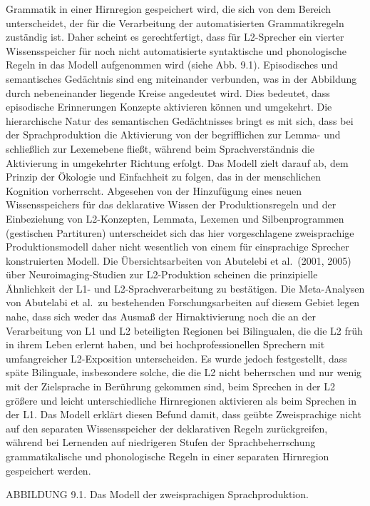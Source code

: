 \documentclass[
  letterpaper,
]{scrbook}
\begin{document}
Grammatik in einer Hirnregion gespeichert wird, die sich von dem Bereich
unterscheidet, der für die Verarbeitung der automatisierten
Grammatikregeln zuständig ist. Daher scheint es gerechtfertigt, dass für
L2-Sprecher ein vierter Wissensspeicher für noch nicht automatisierte
syntaktische und phonologische Regeln in das Modell aufgenommen wird
(siehe Abb. 9.1). Episodisches und semantisches Gedächtnis sind eng
miteinander verbunden, was in der Abbildung durch nebeneinander liegende
Kreise angedeutet wird. Dies bedeutet, dass episodische Erinnerungen
Konzepte aktivieren können und umgekehrt. Die hierarchische Natur des
semantischen Gedächtnisses bringt es mit sich, dass bei der
Sprachproduktion die Aktivierung von der begrifflichen zur Lemma- und
schließlich zur Lexemebene fließt, während beim Sprachverständnis die
Aktivierung in umgekehrter Richtung erfolgt. Das Modell zielt darauf ab,
dem Prinzip der Ökologie und Einfachheit zu folgen, das in der
menschlichen Kognition vorherrscht. Abgesehen von der Hinzufügung eines
neuen Wissensspeichers für das deklarative Wissen der Produktionsregeln
und der Einbeziehung von L2-Konzepten, Lemmata, Lexemen und
Silbenprogrammen (gestischen Partituren) unterscheidet sich das hier
vorgeschlagene zweisprachige Produktionsmodell daher nicht wesentlich
von einem für einsprachige Sprecher konstruierten Modell. Die
Übersichtsarbeiten von Abutelebi et al.~(2001, 2005) über
Neuroimaging-Studien zur L2-Produktion scheinen die prinzipielle
Ähnlichkeit der L1- und L2-Sprachverarbeitung zu bestätigen. Die
Meta-Analysen von Abutelabi et al.~zu bestehenden Forschungsarbeiten auf
diesem Gebiet legen nahe, dass sich weder das Ausmaß der Hirnaktivierung
noch die an der Verarbeitung von L1 und L2 beteiligten Regionen bei
Bilingualen, die die L2 früh in ihrem Leben erlernt haben, und bei
hochprofessionellen Sprechern mit umfangreicher L2-Exposition
unterscheiden. Es wurde jedoch festgestellt, dass späte Bilinguale,
insbesondere solche, die die L2 nicht beherrschen und nur wenig mit der
Zielsprache in Berührung gekommen sind, beim Sprechen in der L2 größere
und leicht unterschiedliche Hirnregionen aktivieren als beim Sprechen in
der L1. Das Modell erklärt diesen Befund damit, dass geübte
Zweisprachige nicht auf den separaten Wissensspeicher der deklarativen
Regeln zurückgreifen, während bei Lernenden auf niedrigeren Stufen der
Sprachbeherrschung grammatikalische und phonologische Regeln in einer
separaten Hirnregion gespeichert werden.

ABBILDUNG 9.1. Das Modell der zweisprachigen Sprachproduktion.
\end{document}
